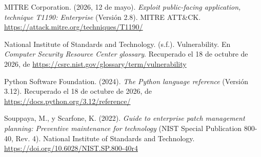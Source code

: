 \begin{list}{}{%
  \setlength{\leftmargin}{1.27cm}%
  \setlength{\itemindent}{-1.27cm}%
  \setlength{\labelwidth}{0pt}%
  \setlength{\labelsep}{0pt}%
  \setlength{\itemsep}{0.6em}%
  \setlength{\parsep}{0pt}%
}
  \item[] MITRE Corporation. (2026, 12 de mayo). \textit{Exploit public-facing application, technique T1190: Enterprise} (Versión 2.8). MITRE ATT\&CK. \url{https://attack.mitre.org/techniques/T1190/}

  \item[] National Institute of Standards and Technology. (s.f.). Vulnerability. En \textit{Computer Security Resource Center glossary}. Recuperado el 18 de octubre de 2026, de \url{https://csrc.nist.gov/glossary/term/vulnerability}

  \item[] Python Software Foundation. (2024). \textit{The Python language reference} (Versión 3.12). Recuperado el 18 de octubre de 2026, de \url{https://docs.python.org/3.12/reference/}

  \item[] Souppaya, M., y Scarfone, K. (2022). \textit{Guide to enterprise patch management planning: Preventive maintenance for technology} (NIST Special Publication 800-40, Rev. 4). National Institute of Standards and Technology. \url{https://doi.org/10.6028/NIST.SP.800-40r4}
\end{list}
